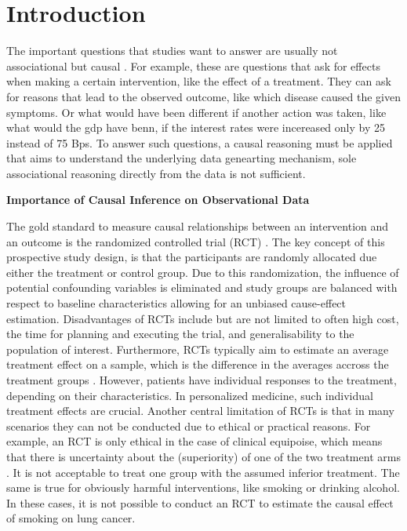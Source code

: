 


\chapter{Introduction}


The important questions that studies want to answer are usually not associational but causal \citep{pearl2009}. For example, these are questions that ask for effects when making a certain intervention, like the effect of a treatment. They can ask for reasons that lead to the observed outcome, like which disease caused the given symptoms. Or what would have been different if another action was taken, like what would the gdp have benn, if the interest rates were incereased only by 25 instead of 75 Bps. To answer such questions, a causal reasoning must be applied that aims to understand the underlying data genearting mechanism, sole associational reasoning directly from the data is not sufficient. 

\textbf{Importance of Causal Inference on Observational Data}


The gold standard to measure causal relationships between an intervention and an outcome is the randomized controlled trial (RCT) \citep{hariton2018}. The key concept of this prospective study design, is that the participants are randomly allocated due either the treatment or control group. Due to this randomization, the influence of potential confounding variables is eliminated and study groups are balanced with respect to baseline characteristics allowing for an unbiased cause-effect estimation.
Disadvantages of RCTs include but are not limited to often high cost, the time for planning and executing the trial, and generalisability to the population of interest. %
Furthermore, RCTs typically aim to estimate an average treatment effect on a sample, which is the difference in the averages accross the treatment groups \citep{nichols2007}. However, patients have individual responses to the treatment, depending on their characteristics. In personalized medicine, such individual treatment effects are crucial.
Another central limitation of RCTs is that in many scenarios they can not be conducted due to ethical or practical reasons. For example, an RCT is only ethical in the case of clinical equipoise, which means that there is uncertainty about the (superiority) of one of the two treatment arms \citep{freedman1987}. It is not acceptable to treat one group with the assumed inferior treatment. The same is true for obviously harmful interventions, like smoking or drinking alcohol. In these cases, it is not possible to conduct an RCT to estimate the causal effect of smoking on lung cancer.

